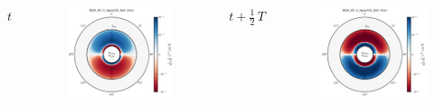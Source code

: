 \documentclass{beamer}
\begin{document}
\begin{frame}

  \begin{columns}[c]

      \centerline{$t$}
      \begin{figure}[htb!]
        \centering
        \includegraphics[width=\textwidth]{fig.DivV2_0.00T.png}
      \end{figure}
      \centerline{$t+\frac{1}{2}\,T$}
      \begin{figure}[htb!]
        \centering
        \includegraphics[width=\textwidth]{fig.DivV2_0.50T.png}

\end{figure}
\end{columns}
\end{frame}
\end{document}
